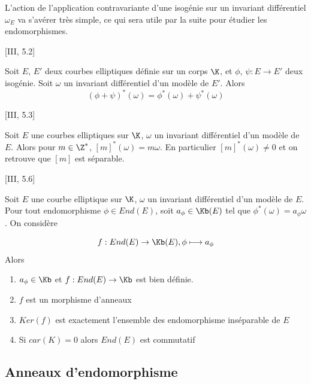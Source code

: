 L'action de l'application contravariante d'une isogénie sur un invariant différentiel $\omega_{E}$ va s'avérer très simple, ce qui sera utile par la suite pour étudier les endomorphismes. 


\begin{The}\cite{Sil09}[III, 5.2]
	
	Soit $E$, $E'$ deux courbes elliptiques définie sur un corps $\K$, et $\phi$, $\psi : E \rightarrow E'$ deux isogénie. Soit $\omega$ un invariant différentiel d'un modèle de $E'$. Alors
	\begin{equation*}
		\left( \phi + \psi\right) ^{*}\left( \omega\right) = \phi^{*}\left( \omega\right) + \psi^{*}\left( \omega\right)
	\end{equation*} 
\end{The}


\begin{Coro}\cite{Sil09}[III, 5.3]
	
	Soit $E$ une courbes elliptiques sur $\K$, $\omega$ un invariant différentiel d'un modèle de $E$. Alors pour $m\in\Z^{*}$,
	$[m]^{*}(\omega) = m\omega$. En particulier $[m]^{*}(\omega) \neq 0 $ et on retrouve que $[m]$ est séparable.
\end{Coro}


\begin{Coro}\cite{Sil09}[III, 5.6]
	
	Soit $E$ une courbe elliptique sur $\K$, $\omega$ un invariant différentiel d'un modèle de $E$. Pour tout endomorphisme $\phi\in End(E)$, soit $a_{\phi}\in\Kb(E)$ tel que $\phi^{*}(\omega) = a_{\phi}\omega$. On considère
	
	\begin{equation*}
		f : End(E)\rightarrow\Kb(E) , \phi\longmapsto a_{\phi}
	\end{equation*}
	Alors
	\begin{enumerate}
		\item $a_{\phi}\in\Kb$ et $f: End(E)\rightarrow\Kb$ est bien définie. 
		\item $f$ est un morphisme d'anneaux
		\item $Ker(f)$ est exactement l'ensemble des endomorphisme inséparable de $E$
		\item Si $car(K) = 0$ alors $End(E)$ est commutatif
	\end{enumerate}
	
\end{Coro}



\subsection{Anneaux d'endomorphisme}


